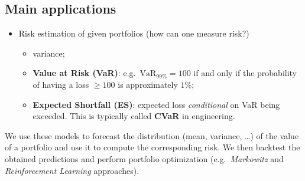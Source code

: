 \documentclass[11pt,a4paper]{article}
\theoremstyle{definition}
\theoremstyle{plain}
\theoremstyle{remark}
\begin{document}
\subsection{Main applications}
\begin{itemize}
    \item Risk estimation of given portfolios 
    (how can one measure risk?)
    \begin{itemize}
        \item variance;
        \item \textbf{Value at Risk (VaR)}: e.g.\ $\text{VaR}_{99\%} = 100$ if and only if the probability of having a loss $\ge 100$ is approximately $1\%$;
        \item \textbf{Expected Shortfall (ES)}: expected loss \emph{conditional} on VaR being exceeded. This is typically called \textbf{CVaR} in engineering.

    \end{itemize}
\end{itemize}
We use these models to forecast the distribution (mean, variance, \dots) of the value of a portfolio
and use it to compute the corresponding risk. 
We then backtest the obtained predictions and perform portfolio optimization (e.g.\ \emph{Markowitz} and \emph{Reinforcement Learning} approaches).
\end{document}
